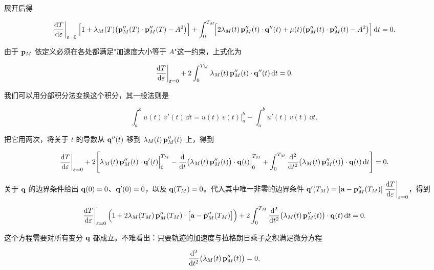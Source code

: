 展开后得

\begin{equation}
\left.\frac{\mathrm{d} T}{\mathrm{d}\varepsilon}\right|_{\varepsilon=0}\Bigl[1+\lambda_M(T)\bigl(\mathbf{p}_M''(T)\cdot\mathbf{p}_M''(T)-A^{2}\bigr)\Bigr]
+\int_{0}^{T_M}\!\Bigl[2\lambda_M(t)\,\mathbf{p}_M''(t)\cdot\mathbf{q}''(t)+\mu(t)\bigl(\mathbf{p}_M''(t)\cdot\mathbf{p}_M''(t)-A^{2}\bigr)\Bigr]\,\mathrm{d} t=0 .
\end{equation}

由于 $\mathbf{p}_M$ 依定义必须在各处都满足"加速度大小等于 $A$"这一约束，上式化为

\begin{equation}
\left.\frac{\mathrm{d} T}{\mathrm{d}\varepsilon}\right|_{\varepsilon=0}
+2\int_{0}^{T_M}\lambda_M(t)\,\mathbf{p}_M''(t)\cdot\mathbf{q}''(t)\,\mathrm{d} t=0 .
\end{equation}

我们可以用分部积分法变换这个积分，其一般法则是

\begin{equation}
\int_{a}^{b}u(t)\,v'(t)\,\dd t
= u(t)\,v(t)\Big|_{a}^{b}-\int_{a}^{b}u'(t)\,v(t)\,\dd t .
\end{equation}

把它用两次，将关于 $t$ 的导数从 $\mathbf{q}''(t)$ 移到 $\lambda_M(t)\,\mathbf{p}_M''(t)$ 上，得到

\begin{equation}
\left.\frac{\mathrm{d} T}{\mathrm{d}\varepsilon}\right|_{\varepsilon=0}
+2\Biggl[
\lambda_M(t)\,\mathbf{p}_M''(t)\cdot\mathbf{q}'(t)\Big|_{0}^{T_M}
-\frac{\mathrm{d}}{\mathrm{d} t}\bigl(\lambda_M(t)\,\mathbf{p}_M''(t)\bigr)\cdot\mathbf{q}(t)\Big|_{0}^{T_M}
+\int_{0}^{T_M}\frac{\mathrm{d}^{2}}{\mathrm{d} t^{2}}\bigl(\lambda_M(t)\,\mathbf{p}_M''(t)\bigr)\cdot\mathbf{q}(t)\,\mathrm{d} t
\Biggr]=0 .
\end{equation}

关于 $\mathbf{q}$ 的边界条件给出 $\mathbf{q}(0)=0$、$\mathbf{q}'(0)=0$，以及 $\mathbf{q}(T_M)=0$。代入其中唯一非零的边界条件 $\mathbf{q}'(T_M)=[\mathbf{a}-\mathbf{p}_M''(T_M)]\left.\dfrac{\mathrm{d} T}{\mathrm{d}\varepsilon}\right|_{\varepsilon=0}$，得到

\begin{equation}
\left.\frac{\mathrm{d} T}{\mathrm{d}\varepsilon}\right|_{\varepsilon=0}
\Bigl(1+2\lambda_M(T_M)\,\mathbf{p}_M''(T_M)\cdot\bigl[\mathbf{a}-\mathbf{p}_M''(T_M)\bigr]\Bigr)
+2\int_{0}^{T_M}\frac{\mathrm{d}^{2}}{\mathrm{d} t^{2}}\bigl(\lambda_M(t)\,\mathbf{p}_M''(t)\bigr)\cdot\mathbf{q}(t)\,\mathrm{d} t=0 .
\end{equation}

这个方程需要对所有变分 $\mathbf{q}$ 都成立。不难看出：只要轨迹的加速度与拉格朗日乘子之积满足微分方程

\begin{equation}
\frac{\mathrm{d}^{2}}{\mathrm{d} t^{2}}\bigl(\lambda_M(t)\,\mathbf{p}_M''(t)\bigr)=0,
\end{equation}

